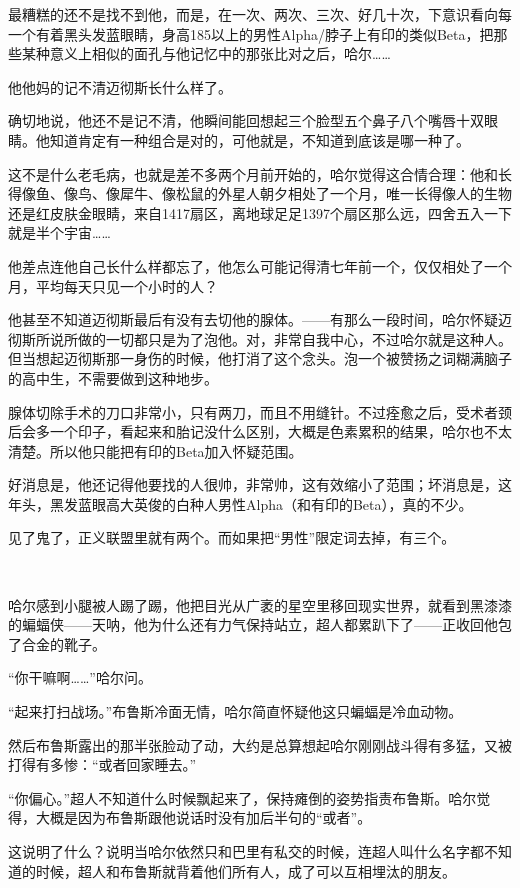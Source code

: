 \documentclass[../main]{subfiles}
\begin{document}
最糟糕的还不是找不到他，而是，在一次、两次、三次、好几十次，下意识看向每一个有着黑头发蓝眼睛，身高185以上的男性Alpha/脖子上有印的类似Beta，把那些某种意义上相似的面孔与他记忆中的那张比对之后，哈尔……

他他妈的记不清迈彻斯长什么样了。

确切地说，他还不是记不清，他瞬间能回想起三个脸型五个鼻子八个嘴唇十双眼睛。他知道肯定有一种组合是对的，可他就是，不知道到底该是哪一种了。

这不是什么老毛病，也就是差不多两个月前开始的，哈尔觉得这合情合理：他和长得像鱼、像鸟、像犀牛、像松鼠的外星人朝夕相处了一个月，唯一长得像人的生物还是红皮肤金眼睛，来自1417扇区，离地球足足1397个扇区那么远，四舍五入一下就是半个宇宙……

他差点连他自己长什么样都忘了，他怎么可能记得清七年前一个，仅仅相处了一个月，平均每天只见一个小时的人？

他甚至不知道迈彻斯最后有没有去切他的腺体。——有那么一段时间，哈尔怀疑迈彻斯所说所做的一切都只是为了泡他。对，非常自我中心，不过哈尔就是这种人。但当想起迈彻斯那一身伤的时候，他打消了这个念头。泡一个被赞扬之词糊满脑子的高中生，不需要做到这种地步。

腺体切除手术的刀口非常小，只有两刀，而且不用缝针。不过痊愈之后，受术者颈后会多一个印子，看起来和胎记没什么区别，大概是色素累积的结果，哈尔也不太清楚。所以他只能把有印的Beta加入怀疑范围。

好消息是，他还记得他要找的人很帅，非常帅，这有效缩小了范围；坏消息是，这年头，黑发蓝眼高大英俊的白种人男性Alpha（和有印的Beta），真的不少。

见了鬼了，正义联盟里就有两个。而如果把“男性”限定词去掉，有三个。

~\

哈尔感到小腿被人踢了踢，他把目光从广袤的星空里移回现实世界，就看到黑漆漆的蝙蝠侠——天呐，他为什么还有力气保持站立，超人都累趴下了——正收回他包了合金的靴子。

“你干嘛啊……”哈尔问。

“起来打扫战场。”布鲁斯冷面无情，哈尔简直怀疑他这只蝙蝠是冷血动物。

然后布鲁斯露出的那半张脸动了动，大约是总算想起哈尔刚刚战斗得有多猛，又被打得有多惨：“或者回家睡去。”

“你偏心。”超人不知道什么时候飘起来了，保持瘫倒的姿势指责布鲁斯。哈尔觉得，大概是因为布鲁斯跟他说话时没有加后半句的“或者”。

这说明了什么？说明当哈尔依然只和巴里有私交的时候，连超人叫什么名字都不知道的时候，超人和布鲁斯就背着他们所有人，成了可以互相埋汰的朋友。
\end{document}
